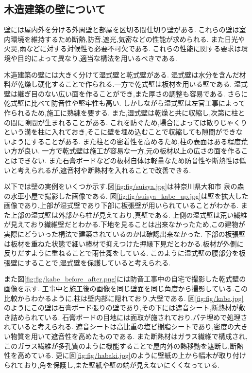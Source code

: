 \subsection*{木造建築の壁について}
壁には屋内外を分ける外周壁と部屋を区切る間仕切り壁がある.
これらの壁は室内環境を維持するため断熱,防音,遮光,気密などの性能が求められる.
また日光や火災,雨などに対する対候性も必要不可欠である.
これらの性能に関する要求は環境や目的によって異なり,適当な構法を用いるべきである.

木造建築の壁には大きく分けて湿式壁と乾式壁がある.
湿式壁は水分を含んだ材料が乾燥し硬化することで作られる.一方で乾式壁は板材を用いる壁である.
湿式壁は継ぎ目のない広い面を作ることができ,また厚さの調整も容易である.
さらに乾式壁に比べて防音性や堅牢性も高い.\cite{mizuho_sissiki:online}
しかしながら湿式壁は左官工事によって作られるため,施工に熟練を要する.
また,湿式壁は乾燥と共に収縮し,次第に柱との間に隙間が生まれることがある.
これを防ぐため,場合によっては散りじゃくりという溝を柱に入れておき,そこに壁を埋め込むことで収縮しても隙間ができないようにすることがある.
また柱との密着性を高めるため,柱の表面はある程度荒い方が良い.
一方で乾式壁は施工が容易な一方,元の板材以上の広さの面を作ることはできない.
また石膏ボードなどの板材自体は軽量なため防音性や断熱性は低いと考えられるが,遮音材や断熱材を入れることで改善できる.

以下では壁の実例をいくつか示す.図\ref{fig:fig/suisya.jpg}は神奈川県大和市 泉の森の水車小屋で撮影した画像である.
図\ref{fig:fig/suisya_kabe_up.jpg}は壁を拡大した画像であり,上部が湿式壁であり下部に板張壁が用いられていることがわかる.
また上部の湿式壁は外部から柱が見えており,真壁である.
上側の湿式壁は荒い繊維が見えており繊維壁だとわかる.下地を見ることは出来なかったため,この建物が実際にどういった構法で建築されているのかは確認出来なかった.
下部の板張壁は板材を重ねた状態で細い棒材で抑えつけた押縁下見だとわかる.板材が外側に反りだすように重ねることで雨仕舞をしている.
このように湿式壁の腰部分を板張壁にすることで,湿式壁を保護していると考えられる.

また図\ref{fig:fig/kabe_before_after.png}には防音工事中の自宅で撮影した乾式壁の画像を示す.
工事中と施工後の画像を同じ壁面を同じ角度から撮影している.この比較からわかるように,柱は壁内部に隠れており,大壁である.
図\ref{fig:fig/kabe.jpg}のようにこの壁は石膏ボード張りの壁であり,その下には遮音シート,断熱材が敷き詰められている.
石膏ボードの目地には面取が施されており,パテ埋めで処理されていると考えられる.
遮音シートは高比重の塩ビ樹脂シートであり,密度の大きい物質を用いて遮音性を高めたものである.\cite{syaon14:online}
また断熱材はガラス繊維で構成され,このガラス繊維が多孔質のように機能することで屋内外の熱移動を遮断し,断熱性を高めている.\cite{mag:online}
更に図\ref{fig:fig/habaki.jpg}のように壁紙の上から幅木が取り付けられており,角を保護し,また壁紙や壁の端が見えないにくくなっている.
